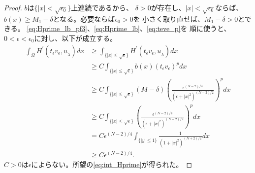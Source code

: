 \begin{proof}
 $b$は$\{ \lvert x \rvert < \sqrt{\epsilon_0}\}$上連続であるから、
 $\delta > 0$が存在し、$\lvert x \rvert < \sqrt{\epsilon_0}$ならば、
 $b(x) \geq M_1 - \delta$となる。必要ならば$\epsilon_0 > 0$を
 小さく取り直せば、$M_1 - \delta > 0$とできる。
 \eqref{eq:Hprime_lb_pf3}、\eqref{eq:Hprime_lb}、\eqref{eq:teve_p}を
 順に使うと、
 $0 < \epsilon < \epsilon_0$に対し、以下が成立する。
 \begin{align*}
  \int_\Omega H^\prime(t_\epsilon v_\epsilon, \underline{u}_\lambda )
  dx & \geq \int_{\{ \lvert x \rvert \leq \sqrt{\epsilon} \}} 
  H^\prime(t_\epsilon v_\epsilon, \underline{u}_\lambda ) dx \\
  & \geq C \int_{\{ \lvert x \rvert \leq \sqrt{\epsilon} \}} 
  b(x) (t_\epsilon v_\epsilon)^p dx \\
  & \geq C \int_{\{ \lvert x \rvert \leq \sqrt{\epsilon} \}} 
  (M - \delta) \left(
  \frac{\epsilon^{(N-2)/4}}{(\epsilon + \lvert x \rvert^2)^{(N-2)/2}}
  \right)^p dx \\
  & \geq C \int_{\{ \lvert x \rvert \leq \sqrt{\epsilon} \}} 
  \left(
  \frac{\epsilon^{(N-2)/4}}{(\epsilon + \lvert x \rvert^2)^{(N-2)/2}}
  \right)^p dx \\
  & = C \epsilon^{(N-2)/4} \int_{ \{ \lvert y \rvert \leq 1 \}}
  \frac{1}{(1 + \lvert x \rvert^2)^{(N+2)/2}} dx \\
  & \geq C \epsilon^{(N-2)/4}.
 \end{align*}
 $C>0$は$\epsilon$によらない。所望の\eqref{eq:int_Hprime}が得られた。\qedhere
\end{proof}

